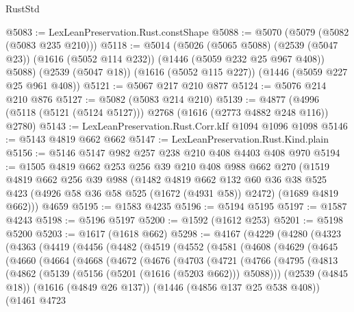 \begin{lexlean}{RustStd}
\begin{coremodule}
@5083 := LexLeanPreservation.Rust.constShape
@5088 := @5070 (@5079 (@5082 (@5083 @235 @210)))
@5118 := @5014
    (@5026
      (@5065 @5088)
      (@2539 (@5047 @23))
      (@1616 (@5052 @114 @232))
      (@1446 (@5059 @232 @25 @967 @408))
      @5088)
    (@2539 (@5047 @18))
    (@1616 (@5052 @115 @227))
    (@1446 (@5059 @227 @25 @961 @408))
@5121 := @5067 @217 @210 @877
@5124 := @5076 @214 @210 @876
@5127 := @5082 (@5083 @214 @210)
@5139 := @4877 (@4996 (@5118 (@5121 (@5124 @5127))) @2768 (@1616 (@2773 @4882 @248 @116)) @2780)
@5143 := LexLeanPreservation.Rust.Corr.kIf @1094 @1096 @1098
@5146 := @5143 @4819 @662 @662
@5147 := LexLeanPreservation.Rust.Kind.plain
@5156 := @5146 @5147 @982 @257 @238 @210 @408 @4403 @408 @970
@5194 := @1505
    @4819
    @662
    @253
    @256
    @39
    @210
    @408
    @988
    @662
    @270
    (@1519
      @4819
      @662
      @256
      @39
      @988
      (@1482
        @4819
        @662
        @132
        @60
        @36
        @38
        @525
        @423
        (@4926 @58 @36 @58 @525 (@1672 (@4931 @58)) @2472)
        (@1689 @4819 @662)))
    @4659
@5195 := @1583 @4235
@5196 := @5194 @5195
@5197 := @1587 @4243
@5198 := @5196 @5197
@5200 := @1592 (@1612 @253)
@5201 := @5198 @5200
@5203 := @1617 (@1618 @662)
@5298 := @4167
    (@4229
      (@4280
        (@4323
          (@4363
            (@4419
              (@4456
                (@4482
                  (@4519
                    (@4552
                      (@4581
                        (@4608
                          (@4629
                            (@4645
                              (@4660
                                (@4664
                                  (@4668
                                    (@4672
                                      (@4676
                                        (@4703
                                          (@4721
                                            (@4766
                                              (@4795
                                                (@4813
                                                  (@4862
                                                    (@5139
                                                      (@5156 (@5201 (@1616 (@5203 @662))) @5088)))
                                                  (@2539 (@4845 @18))
                                                  (@1616 (@4849 @26 @137))
                                                  (@1446 (@4856 @137 @25 @538 @408))
                                                  (@1461
                                                    @4723

\end{coremodule}
\end{lexlean}
